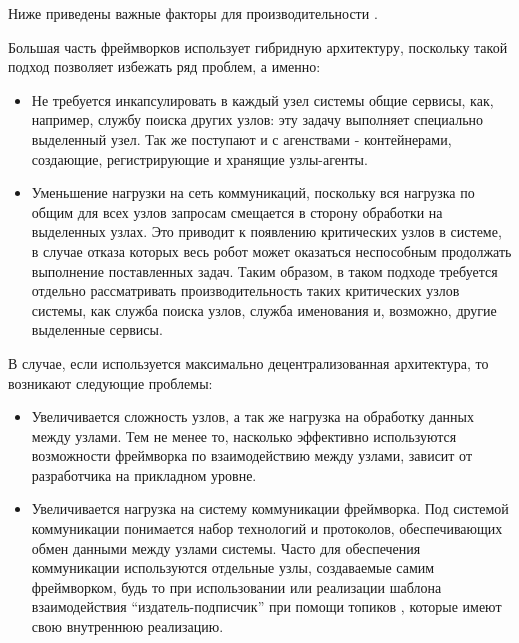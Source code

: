 Ниже приведены важные факторы для производительности \marm{} \cite{blasco2012multiagent}.

\begin{description}[noitemsep]
	
	\item [Тип архитектуры.] Большая часть фреймворков использует гибридную архитектуру, поскольку такой подход позволяет избежать ряд проблем, а именно:
	\begin{itemize}[noitemsep]
		\item Не требуется инкапсулировать в каждый узел системы общие сервисы, как, например, службу поиска других узлов: эту задачу выполняет специально выделенный узел. Так же поступают и с агенствами - контейнерами, создающие, регистрирующие и хранящие узлы-агенты.
		\item Уменьшение нагрузки на сеть коммуникаций, поскольку вся нагрузка по общим для всех узлов запросам смещается в сторону обработки на выделенных узлах. Это приводит к появлению критических узлов в системе, в случае отказа которых весь робот может оказаться неспособным продолжать выполнение поставленных задач. Таким образом, в таком подходе требуется отдельно рассматривать производительность таких критических узлов системы, как служба поиска узлов, служба именования и, возможно, другие выделенные сервисы.
	\end{itemize}
	В случае, если используется максимально децентрализованная архитектура, то возникают следующие проблемы:
	\begin{itemize}[noitemsep]
		\item Увеличивается сложность узлов, а так же нагрузка на обработку данных между узлами. Тем не менее то, насколько эффективно используются возможности фреймворка по взаимодействию между узлами, зависит от разработчика на прикладном уровне.
		\item Увеличивается нагрузка на систему коммуникации фреймворка. Под системой коммуникации понимается набор технологий и протоколов, обеспечивающих обмен данными между узлами системы. Часто для обеспечения коммуникации используются отдельные узлы, создаваемые самим фреймворком, будь то  при использовании  или реализации шаблона взаимодействия \enquote{издатель-подписчик} при помощи топиков , которые имеют свою внутреннюю реализацию.
	\end{itemize}


\end{description}

